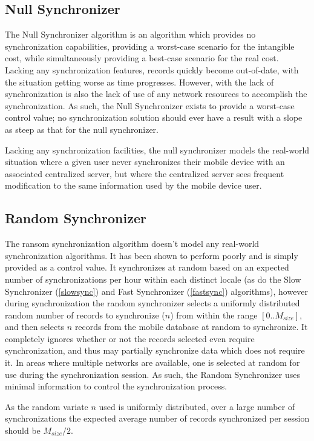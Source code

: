 \subsection{Null Synchronizer}

The Null Synchronizer algorithm is an algorithm which provides no synchronization capabilities, providing a worst-case scenario for the intangible cost, while simultaneously providing a best-case scenario for the real cost.  Lacking any synchronization features, records quickly become out-of-date, with the situation getting worse as time progresses.  However, with the lack of synchronization is also the lack of use of any network resources to accomplish the synchronization.  As such, the Null Synchronizer exists to provide a worst-case control value; no synchronization solution should ever have a result with a slope as steep as that for the null synchronizer.

Lacking any synchronization facilities, the null synchronizer models the real-world situation where a given user never synchronizes their mobile device with an associated centralized server, but where the centralized server sees frequent modification to the same information used by the mobile device user.

\subsection{Random Synchronizer}

The ransom synchronization algorithm doesn't model any real-world synchronization algorithms.  It has been shown to perform poorly \cite{335391} and is simply provided as a control value.  It synchronizes at random based on an expected number of synchronizations per hour within each distinct locale (as do the Slow Synchronizer (\ref{slowsync}) and Fast Synchronizer (\ref{fastsync}) algorithms), however during synchronization the random synchronizer selects a uniformly distributed random number of records to synchronize ($n$) from within the range $[0..M_{size}]$, and then selects $n$ records from the mobile database at random to synchronize.  It completely ignores whether or not the records selected even require synchronization, and thus may partially synchronize data which does not require it.  In areas where multiple networks are available, one is selected at random for use during the synchronization session.  As such, the Random Synchronizer uses minimal information to control the synchronization process.

As the random variate $n$ used is uniformly distributed, over a large number of synchronizations the expected average number of records synchronized per session should be $M_{size}/2$.

